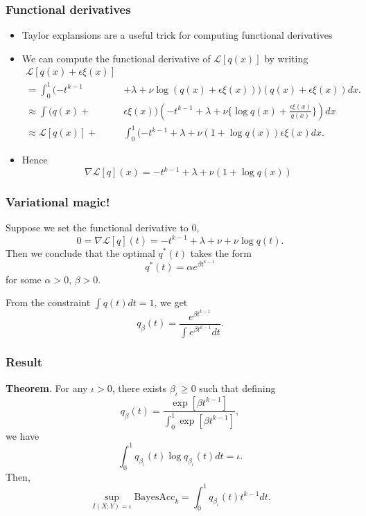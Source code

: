 \documentclass{beamer}
\begin{document}
\begin{frame}
\frametitle{Functional derivatives}
\begin{itemize}
\item Taylor explansions are a useful trick for computing functional derivatives
\item We can compute the functional derivative of $\mathcal{L}[q(x)]$ by writing
\begin{align*}
\mathcal{L}[q(x) + \epsilon \xi(x)] &
\\= \int_0^1 (-t^{k-1} &+ \lambda + \nu \log (q(x) + \epsilon \xi(x))) (q(x) + \epsilon \xi(x)) dx.
\\\approx  \int (q(x) + &\epsilon \xi(x)) (-t^{k-1} + \lambda + \nu \{\log q(x) + \frac{\epsilon \xi(x)}{q(x)}\}) dx
\\\approx  \mathcal{L}[q(x)] +& \int_0^1 (-t^{k-1} + \lambda + \nu (1 + \log q(x)) \epsilon\xi(x) dx.
\end{align*}
\item Hence
\[
\nabla \mathcal{L}[q](x) = -t^{k-1} + \lambda + \nu (1 + \log q(x))
\]
\end{itemize}
\end{frame}

\begin{frame}
\frametitle{Variational magic!}
Suppose we set the functional derivative to 0,
\[
0 = \nabla \mathcal{L}[q](t) = -t^{k-1} + \lambda + \nu + \nu \log q(t).
\]
Then we conclude that the optimal $q^*(t)$ takes the form
\[
q^*(t) = \alpha e^{\beta t^{k-1}}
\]
for some $\alpha > 0$, $\beta > 0$.

From the constraint $\int q(t)dt = 1$, we get
\[
q_\beta(t) = \frac{e^{\beta t^{k-1}}}{\int e^{\beta t^{k-1}} dt}.
\]
\end{frame}

\begin{frame}
\frametitle{Result}
\textbf{Theorem}.
For any $\iota > 0$, there exists $\beta_\iota \geq 0$ such that defining
\[
q_\beta(t) = \frac{\exp[\beta t^{k-1}]}{\int_0^1 \exp[\beta t^{k-1}]},
\]
we have
\[
\int_0^1 q_{\beta_\iota}(t) \log q_{\beta_\iota}(t) dt = \iota.
\]
Then,
\[
\sup_{I(X; Y) = \iota} \text{BayesAcc}_k = \int_0^1 q_{\beta_\iota}(t) t^{k-1} dt.
\]
\end{frame}
\end{document}
